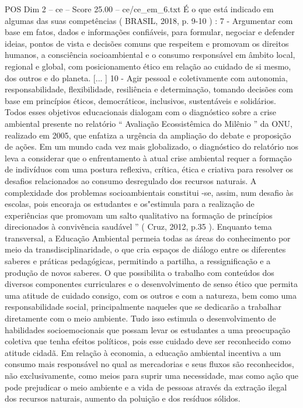\begin{textsample}{POS Dim 2 – ce – Score 25.00 – ce/ce\_em\_6.txt}
É o que está indicado em algumas das suas competências ( BRASIL, 2018, p. 9-10 ) : 7 - Argumentar com base em fatos, dados e informações confiáveis, para formular, negociar e defender ideias, pontos de vista e decisões comuns que respeitem e promovam os direitos humanos, a consciência socioambiental e o consumo responsável em âmbito local, regional e global, com posicionamento ético em relação ao cuidado de si mesmo, dos outros e do planeta. [... ] 10 - Agir pessoal e coletivamente com autonomia, responsabilidade, flexibilidade, resiliência e determinação, tomando decisões com base em princípios éticos, democráticos, inclusivos, sustentáveis e solidários.
Todos esses objetivos educacionais dialogam com o diagnóstico sobre a crise ambiental presente no relatório “ Avaliação Ecossistêmica do Milênio ” da ONU, realizado em 2005, que enfatiza a urgência da ampliação do debate e proposição de ações.
Em um mundo cada vez mais globalizado, o diagnóstico do relatório nos leva a considerar que o enfrentamento à atual crise ambiental requer a formação de indivíduos com uma postura reflexiva, crítica, ética e criativa para resolver os desafios relacionados ao consumo desregulado dos recursos naturais.
A complexidade dos problemas socioambientais constitui -se, assim, num desafio às escolas, pois encoraja os estudantes e os"estimula para a realização de experiências que promovam um salto qualitativo na formação de princípios direcionados à convivência saudável ” ( Cruz, 2012, p.35 ).
Enquanto tema transversal, a Educação Ambiental permeia todas as áreas do conhecimento por meio da transdisciplinaridade, o que cria espaços de diálogo entre os diferentes saberes e práticas pedagógicas, permitindo a partilha, a ressignificação e a produção de novos saberes.
O que possibilita o trabalho com conteúdos dos diversos componentes curriculares e o desenvolvimento de senso ético que permita uma atitude de cuidado consigo, com os outros e com a natureza, bem como uma responsabilidade social, principalmente naqueles que se dedicarão a trabalhar diretamente com o meio ambiente.
Tudo isso estimula o desenvolvimento de habilidades socioemocionais que possam levar os estudantes a uma preocupação coletiva que tenha efeitos políticos, pois esse cuidado deve ser reconhecido como atitude cidadã.
Em relação à economia, a educação ambiental incentiva a um consumo mais responsável no qual as mercadorias e seus fluxos são reconhecidos, não exclusivamente, como meios para suprir uma necessidade, mas como ação que pode prejudicar o meio ambiente e a vida de pessoas através da extração ilegal dos recursos naturais, aumento da poluição e dos resíduos sólidos.

\end{textsample}

